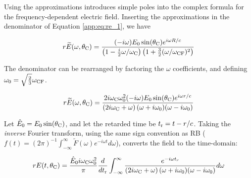 \documentclass[amsmath,amssymb,aps,prd,10pt,twocolumn]{revtex4}
\begin{document}
Using the approximations introduces simple poles into the complex formula for the frequency-dependent electric field.  Inserting the approximations in the denominator of Equation \ref{app:eq:re_1}, we have

\begin{equation}
r\widetilde{E}(\omega,\theta_{\rm C}) = \frac{(-i\omega) E_0 \sin(\theta_{\rm C}) e^{i\omega R/c}}{\left(1-\frac{i}{2} \omega/\omega_{\rm C}\right) \left(1+\frac{3}{2}(\omega/\omega_{\rm CF})^2 \right) }
\end{equation}

The denominator can be rearranged by factoring the $\omega$ coefficients, and defining $\omega_0 = \sqrt{\frac{2}{3	}}\omega_{\rm CF}$.

\begin{equation}
r\widetilde{E}(\omega,\theta_{\rm C}) = \frac{ 2 i \omega_{\rm C} \omega_{\rm 0}^2 (-i\omega) E_0 \sin(\theta_{\rm C}) e^{i\omega r/c}}{ \left(2 i \omega_{\rm C} + \omega \right) (\omega+i\omega_{\rm 0}) (\omega - i\omega_{\rm 0}) }
\end{equation}

Let $\hat{E}_{\rm 0} = E_{\rm 0} \sin(\theta_{\rm C})$, and let the retarded time be $t_{\rm r} = t - r/c$.  Taking the \textit{inverse} Fourier transform, using the same sign convention as RB \cite{10.1103/physrevd.65.016003} ($f(t) = (2\pi)^{-1} \int_{-\infty}^{\infty} \widetilde{F}(\omega) e^{-i\omega t} d\omega$), converts the field to the time-domain:

\begin{widetext}
\begin{equation}
r E(t,\theta_{\rm C}) = \frac{\hat{E}_0 i \omega_{\rm C} \omega_{\rm 0}^2}{\pi} \frac{d}{dt_{\rm r}}\int_{-\infty}^{\infty} \frac{ e^{-i\omega t_r}}{ \left(2 i \omega_{\rm C} + \omega \right) (\omega+i\omega_{\rm 0}) (\omega - i\omega_{\rm 0}) } d\omega \label{app:eq:part1}
\end{equation}
\end{widetext}
\end{document}
